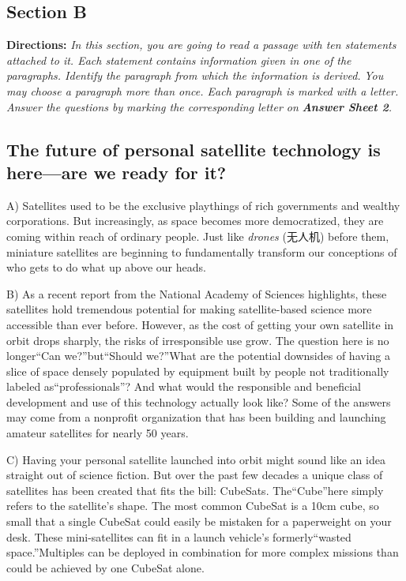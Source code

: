 \documentclass[UTF8,11pt]{ctexart}
\begin{document}
\subsection*{\textbf{Section B}}


\textbf{Directions:}\textit{ In this section, you are going to read a passage with ten statements attached to it. Each statement} \textit{contains information given in one of the paragraphs. Identify the paragraph from which the information is derived.} \textit{You may choose a paragraph more than once. Each paragraph is marked with a letter. Answer the questions by} \textit{marking the corresponding letter on}\textbf{\textit{ Answer Sheet 2}}\textit{.}


\subsection*{\textbf{The future of personal satellite technology is here}—\textbf{are we ready for it?}}


A) Satellites used to be the exclusive playthings of rich governments and wealthy corporations. But increasingly, as space becomes more democratized, they are coming within reach of ordinary people. Just like\textit{ drones} (无人机) before them, miniature satellites are beginning to fundamentally transform our conceptions of who gets to do what up above our heads.


B) As a recent report from the National Academy of Sciences highlights, these satellites hold tremendous potential for making satellite-based science more accessible than ever before. However, as the cost of getting your own satellite in orbit drops sharply, the risks of irresponsible use grow. The question here is no longer“Can we?”but“Should we?”What are the potential downsides of having a slice of space densely populated by equipment built by people not traditionally labeled as“professionals”? And what would the responsible and beneficial development and use of this technology actually look like? Some of the answers may come from a nonprofit organization that has been building and launching amateur satellites for nearly 50 years.


C) Having your personal satellite launched into orbit might sound like an idea straight out of science fiction. But over the past few decades a unique class of satellites has been created that fits the bill: CubeSats. The“Cube”here simply refers to the satellite's shape. The most common CubeSat is a 10cm cube, so small that a single CubeSat could easily be mistaken for a paperweight on your desk. These mini-satellites can fit in a launch vehicle's formerly“wasted space.”Multiples can be deployed in combination for more complex missions than could be achieved by one CubeSat alone.
\end{document}
